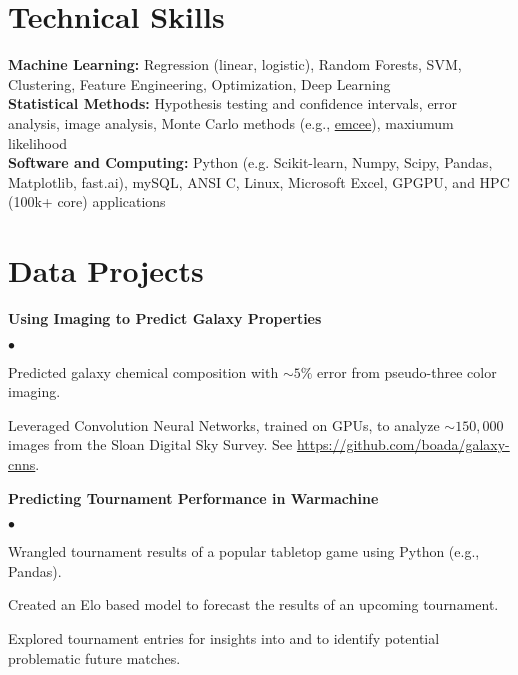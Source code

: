 \documentclass[margin,line, 11pt]{res}
\newenvironment{list2}{
  \begin{list}{$\bullet$}{%
      \setlength{\itemsep}{0in}
      \setlength{\parsep}{0in} \setlength{\parskip}{0in}
      \setlength{\topsep}{0in} \setlength{\partopsep}{0in}
      \setlength{\leftmargin}{0.2in}}}{\end{list}}
\begin{document}
\begin{resume}
\section{Technical Skills}
\textbf{Machine Learning:} Regression (linear, logistic), Random Forests, SVM, Clustering, Feature Engineering, Optimization, Deep Learning\\
\textbf{Statistical Methods:} Hypothesis testing and confidence intervals, error analysis, image analysis, Monte Carlo methods (e.g., \href{https://github.com/dfm/emcee}{emcee}), maxiumum likelihood\\
\textbf{Software and Computing:}  Python (e.g. Scikit-learn, Numpy, Scipy, Pandas, Matplotlib, fast.ai), mySQL, ANSI C, Linux, Microsoft Excel, GPGPU, and HPC (100k+ core) applications\\
\vspace*{-8mm}

\section{Data Projects}
\textbf{Using Imaging to Predict Galaxy Properties}\newline
    \begin{list2}
    	\vspace*{-5mm}
      \item Predicted galaxy chemical composition with $\sim5\%$ error from pseudo-three color imaging.
    	\item Leveraged Convolution Neural Networks, trained on GPUs, to analyze $\sim150,000$ images from the Sloan Digital Sky Survey. See \url{https://github.com/boada/galaxy-cnns}.
    \end{list2}
    \vspace*{-4mm}
\textbf{Predicting Tournament Performance in Warmachine}\newline
    \begin{list2}
    	\vspace*{-5mm}
    	\item Wrangled tournament results of a popular tabletop game using Python (e.g., Pandas).
    	\item Created an Elo based model to forecast the results of an upcoming tournament.
    	\item Explored tournament entries for insights into and to identify potential problematic future matches.
    \end{list2}
\vspace*{-2mm}


\end{resume}
\end{document}
